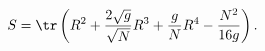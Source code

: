 \begin{equation}\label{Higgs_shifted}
    S=\tr\left(R^2+
    \frac{2\sqrt g}{\sqrt N}R^3+\frac g N R^4-\frac{N^2}{16
    g}\right).
\end{equation}

